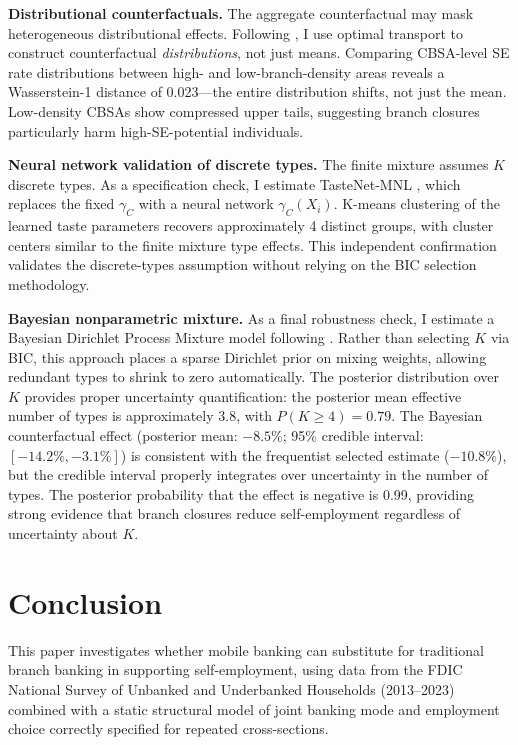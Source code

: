 \documentclass[12pt]{article}
\begin{document}
\textbf{Distributional counterfactuals.} The aggregate counterfactual may mask heterogeneous distributional effects. Following \citet{gunsilius2023}, I use optimal transport to construct counterfactual \textit{distributions}, not just means. Comparing CBSA-level SE rate distributions between high- and low-branch-density areas reveals a Wasserstein-1 distance of 0.023---the entire distribution shifts, not just the mean. Low-density CBSAs show compressed upper tails, suggesting branch closures particularly harm high-SE-potential individuals.

\textbf{Neural network validation of discrete types.} The finite mixture assumes $K$ discrete types. As a specification check, I estimate TasteNet-MNL \citep{han2022}, which replaces the fixed $\gamma_C$ with a neural network $\gamma_C(X_i)$. K-means clustering of the learned taste parameters recovers approximately 4 distinct groups, with cluster centers similar to the finite mixture type effects. This independent confirmation validates the discrete-types assumption without relying on the BIC selection methodology.

\textbf{Bayesian nonparametric mixture.} As a final robustness check, I estimate a Bayesian Dirichlet Process Mixture model following \citet{malsiner2016}. Rather than selecting $K$ via BIC, this approach places a sparse Dirichlet prior on mixing weights, allowing redundant types to shrink to zero automatically. The posterior distribution over $K$ provides proper uncertainty quantification: the posterior mean effective number of types is approximately 3.8, with $P(K \geq 4) = 0.79$. The Bayesian counterfactual effect (posterior mean: $-8.5\%$; 95\% credible interval: $[-14.2\%, -3.1\%]$) is consistent with the frequentist selected estimate ($-10.8\%$), but the credible interval properly integrates over uncertainty in the number of types. The posterior probability that the effect is negative is 0.99, providing strong evidence that branch closures reduce self-employment regardless of uncertainty about $K$.

\section{Conclusion}

This paper investigates whether mobile banking can substitute for traditional branch banking in supporting self-employment, using data from the FDIC National Survey of Unbanked and Underbanked Households (2013--2023) combined with a static structural model of joint banking mode and employment choice correctly specified for repeated cross-sections.
\end{document}
